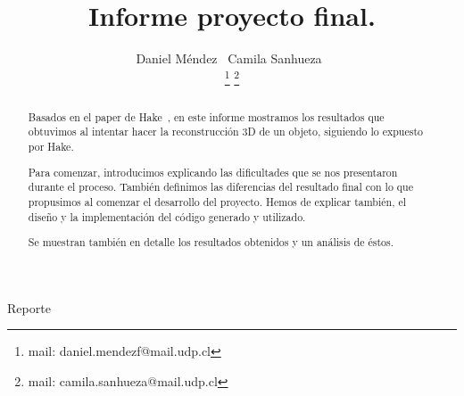 \documentclass[twocolumn,11pts]{IEEEtran}
\begin{document}
%
\title{Informe proyecto final.}
%

\author{Daniel Méndez~ Camila Sanhueza~%

\thanks{mail: daniel.mendezf@mail.udp.cl}%
\thanks{mail: camila.sanhueza@mail.udp.cl}%
}
% 
%


%
{Reporte}%

\maketitle
\begin{abstract}
Basados en el paper de Hake~\cite{ourpaper}, en este informe mostramos los resultados que obtuvimos al intentar hacer la reconstrucción 3D de un objeto, siguiendo lo expuesto por Hake. 

Para comenzar, introducimos explicando las dificultades que se nos presentaron durante el proceso. También definimos las diferencias del resultado final con lo que propusimos al comenzar el desarrollo del proyecto. Hemos de explicar también, el diseño y la implementación del código generado y utilizado. 

Se muestran también en detalle los resultados obtenidos y un análisis de éstos.
\end{abstract}
\end{document}
